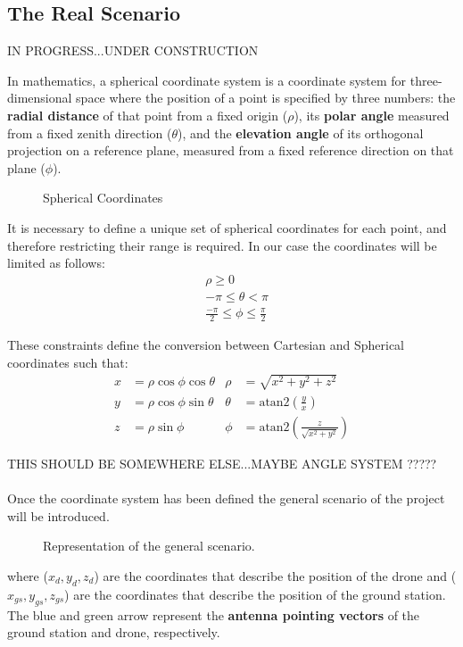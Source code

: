\subsection{The Real Scenario}

IN PROGRESS...UNDER CONSTRUCTION

In mathematics, a spherical coordinate system is a coordinate system for three-dimensional space where the position of a point is specified by three numbers: the \textbf{radial distance} of that point from a fixed origin ($\rho$), its \textbf{polar angle} measured from a fixed zenith direction ($\theta$), and the \textbf{elevation angle} of its orthogonal projection on a reference plane, measured from a fixed reference direction on that plane ($\phi$).

\begin{figure}[H]
   \centering
     
    \label{fig:Spherical1}
    \caption{Spherical Coordinates}
\end{figure}

 It is necessary to define a unique set of spherical coordinates for each point, and therefore restricting their range is required. In our case the coordinates will be limited as follows:
\begin{align*}
& \rho \geq 0 \\
& -\pi \leq \theta < \pi \\
& \frac{-\pi}{2} \leq \phi \leq \frac{\pi}{2}
\label{eq:los_distToHorizon}
\end{align*} 

These constraints define the conversion between Cartesian and Spherical coordinates such that:
\begin{align*}
x &=  \rho\cos\phi\cos\theta  & \rho &= \sqrt{x^{2} + y^{2} + z^{2}} \\
y &= \rho\cos\phi\sin\theta   & \theta &= \text{atan2}\left(\frac{y}{x}\right)\\
z &= \rho\sin\phi       & \phi &=  \text{atan2}\left(\frac{z}{\sqrt{x^2 + y^2}}\right)
\label{eq:los_distToHorizon}
\end{align*} 

THIS SHOULD BE SOMEWHERE ELSE...MAYBE ANGLE SYSTEM ?????
\paragraph{} Once the coordinate system has been defined the general scenario of the project will be introduced.
\begin{figure}[H]
   \centering
     
    \label{fig:Scenario1}
    \caption{Representation of the general scenario.}
\end{figure}
where ($x_d,y_d,z_d$) are the coordinates that describe the position of the drone and ($x_{gs},y_{gs},z_{gs}$) are the coordinates that describe the position of the ground station.
The blue and green arrow represent the \textbf{antenna pointing vectors} of the ground station and drone, respectively.

